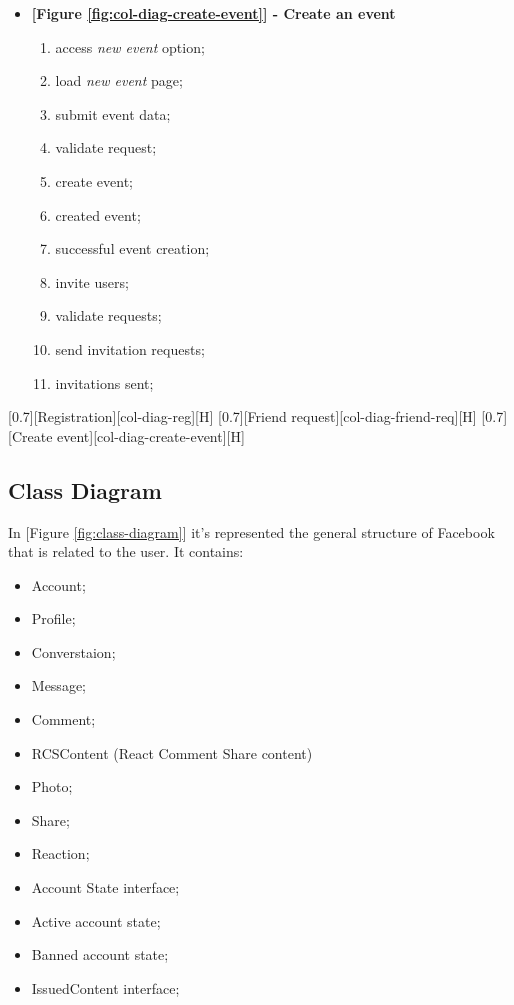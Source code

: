 \documentclass{article}
\begin{document}
\begin{itemize}
				\item \textbf{[Figure \ref{fig:col-diag-create-event}] - Create an event}
				\begin{enumerate}
					\item access \textit{new event} option;
					\item load \textit{new event} page;
					\item submit event data;
					\item validate request;
					\item create event;
					\item created event;
					\item successful event creation;
					\item invite users;
					\item validate requests;
					\item send invitation requests;
					\item invitations sent;
				\end{enumerate}
			\end{itemize}

			[0.7][Registration][col-diag-reg][H]
			[0.7][Friend request][col-diag-friend-req][H]
			[0.7][Create event][col-diag-create-event][H]

		\subsection{Class Diagram}
			In [Figure \ref{fig:class-diagram}] it's represented the general structure of Facebook that is related to the user. It contains:
			\begin{itemize}
				\item Account;
				\item Profile;
				\item Converstaion;
				\item Message;
				\item Comment;
				\item RCSContent (React Comment Share content)
				\item Photo;
				\item Share;
				\item Reaction;
				\item Account State interface;
				\item Active account state;
				\item Banned account state;
				\item IssuedContent interface;
			\end{itemize}
\end{document}
